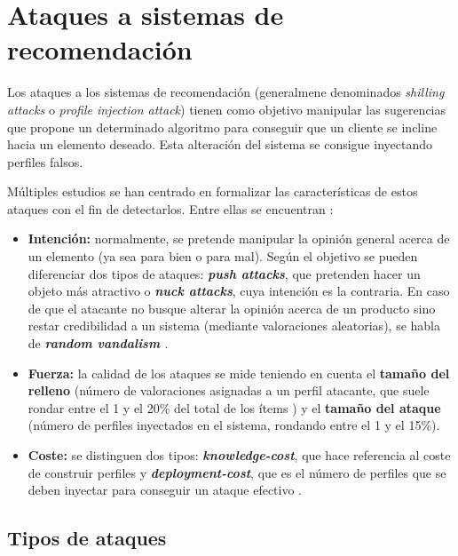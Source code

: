 \section{Ataques a sistemas de recomendación}

Los ataques a los sistemas de recomendación (generalmene denominados \textit{shilling attacks} o \textit{profile injection attack}) tienen como objetivo manipular las sugerencias que propone un determinado algoritmo para conseguir que un cliente se incline hacia un elemento deseado. Esta alteración del sistema se consigue inyectando perfiles falsos.

Múltiples estudios se han centrado en formalizar las características de estos ataques con el fin de detectarlos. Entre ellas se encuentran \cite{mingdan2018ShillingAttacksAReview}:

\begin{itemize}
	
	\item \textbf{Intención:} normalmente, se pretende manipular la opinión general acerca de un elemento (ya sea para bien o para mal). Según el objetivo se pueden diferenciar dos tipos de ataques: \textbf{\textit{push attacks}}, que pretenden hacer un objeto más atractivo o \textbf{\textit{nuck attacks}}, cuya intención es la contraria. En caso de que el atacante no busque alterar la opinión acerca de un producto sino restar credibilidad a un sistema (mediante valoraciones aleatorias), se habla de \textbf{\textit{random vandalism} \cite{Burke2015RobustCollaborative}}.
	
	\item \textbf{Fuerza:} la calidad de los ataques se mide teniendo en cuenta el \textbf{tamaño del relleno} (número de valoraciones asignadas a un perfil atacante, que suele rondar entre el 1 y el 20\% del total de los ítems \cite{mingdan2018ShillingAttacksAReview}) y el \textbf{tamaño del ataque} (número de perfiles inyectados en el sistema, rondando entre el 1 y el 15\%).
	
	\item \textbf{Coste:} se distinguen dos tipos: \textbf{\textit{knowledge-cost}}, que hace referencia al coste de construir perfiles y \textbf{\textit{deployment-cost}}, que es el número de perfiles que se deben inyectar para conseguir un ataque efectivo \cite{Mobasher2006Thesis}.
	
\end{itemize}
		
\subsection{Tipos de ataques}

